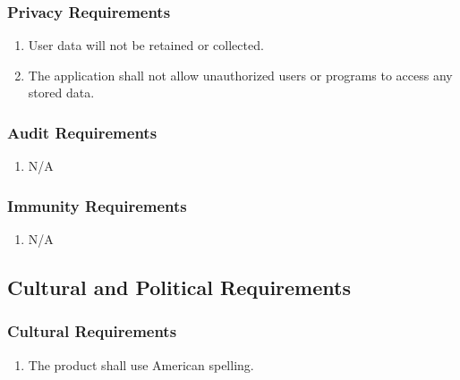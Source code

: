 \documentclass[12pt]{article}
\begin{document}
    \subsubsection{Privacy Requirements}
    \label{ssub:privacy_requirements}
    \begin{enumerate}[{SR-P}1. ]
        \item User data will not be retained or collected.
        \item The application shall not allow unauthorized users or programs to access any stored data.
    \end{enumerate}
    
    \subsubsection{Audit Requirements}
    \label{ssub:audit_requirements}
    \begin{enumerate}[{SR-AU}1. ]
        \item N/A
    \end{enumerate}
    
    \subsubsection{Immunity Requirements}
    \label{ssub:immunity_requirements}
    \begin{enumerate}[{SR-I}1. ]
        \item N/A
    \end{enumerate}
    
    
    \subsection{Cultural and Political Requirements}
    \label{sub:cultural_and_political_requirements}
    
    \subsubsection{Cultural Requirements}
    \label{ssub:cultural_requirements}
    \begin{enumerate}[{CP-C}1. ]
        \item The product shall use American spelling.
    \end{enumerate}
    
\end{document}
